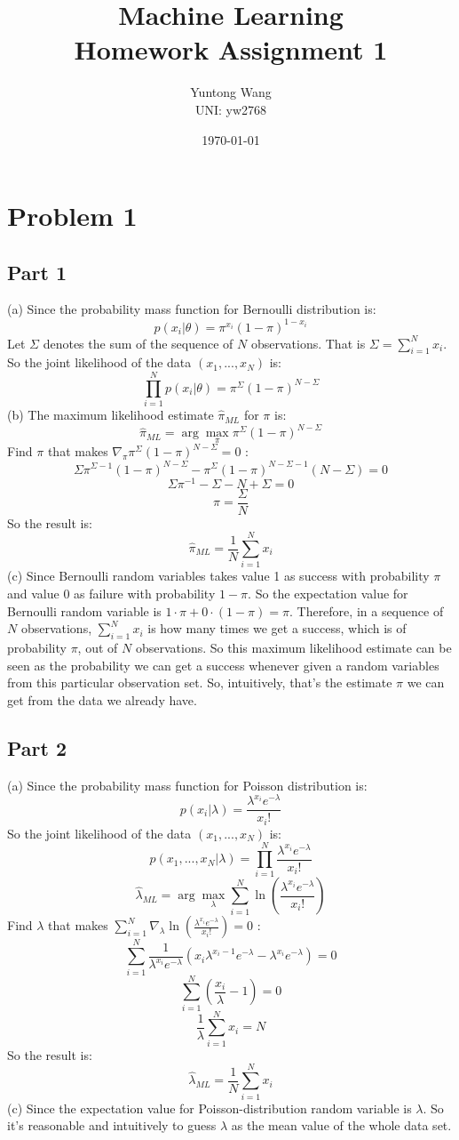 \documentclass{article}
\title{Machine Learning\\Homework Assignment 1}
\author{Yuntong Wang\\UNI: yw2768}
\date{\today}
\begin{document}
\maketitle

\section{Problem 1}

\subsection{Part 1}

(a) Since the probability mass function for Bernoulli distribution is:
$$ p(x_i|\theta) = \pi^{x_i}(1-\pi)^{1-x_i} $$
Let $\Sigma$ denotes the sum of the sequence of $N$ observations. That is  $\Sigma = \displaystyle \sum_{i=1}^{N}x_i$. So the joint likelihood of the data $(x_1,...,x_N)$ is:
$$\prod_{i=1}^{N}p(x_i|\theta) = \pi^\Sigma(1-\pi)^{N-\Sigma}$$
(b) The maximum likelihood estimate $\hat{\pi}_{ML}$ for $\pi$ is:
$$\hat{\pi}_{ML}= \arg \max_{\pi}\pi^\Sigma(1-\pi)^{N-\Sigma}$$
Find $\pi$ that makes $\nabla_{\pi}\pi^\Sigma(1-\pi)^{N-\Sigma}=0$ :
$$\Sigma\pi^{\Sigma-1}(1-\pi)^{N-\Sigma} - \pi^{\Sigma}(1-\pi)^{N-\Sigma-1}(N-\Sigma) = 0$$
$$\Sigma\pi^{-1}-\Sigma-N+\Sigma = 0$$
$$\pi = \frac{\Sigma}{N}$$
So the result is:
$$\hat{\pi}_{ML} = \frac{1}{N}{\displaystyle \sum_{i=1}^{N}x_i}$$
(c) Since Bernoulli random variables takes value 1 as success with probability $\pi$ and value 0 as failure with probability $1-\pi$. So the expectation value for Bernoulli random variable is $1\cdot\pi+0\cdot(1-\pi) = \pi$. Therefore, in a sequence of $N$ observations, ${\displaystyle \sum_{i=1}^{N}x_i}$ is how many times we get a success, which is of probability $\pi$, out of $N$ observations. So this maximum likelihood estimate can be seen as the probability we can get a success whenever given a random variables from this particular observation set. So, intuitively, that's the estimate $\pi$ we can get from the data we already have.

\subsection{Part 2}

(a) Since the probability mass function for Poisson distribution is:
$$ p(x_i|\lambda) = \frac{\lambda^{x_i}e^{-\lambda}}{{x_i}!} $$
So the joint likelihood of the data $(x_1,...,x_N)$ is:
$$p(x_1,...,x_N|\lambda) = \prod_{i=1}^{N}\frac{\lambda^{x_i}e^{-\lambda}}{{x_i}!}$$
$$\hat{\lambda}_{ML} = \arg \max_{\lambda}\sum_{i=1}^{N}\ln(\frac{\lambda^{x_i}e^{-\lambda}}{{x_i}!})$$
Find $\lambda$ that makes $\displaystyle \sum_{i=1}^{N}\nabla_{\lambda}\ln(\frac{\lambda^{x_i}e^{-\lambda}}{{x_i}!})=0$ :
$$\displaystyle \sum_{i=1}^{N}\frac{1}{\lambda^{x_i}e^{-\lambda}}(x_i\lambda^{x_i-1}e^{-\lambda}-\lambda^{x_i}e^{-\lambda}) = 0$$
$$\displaystyle \sum_{i=1}^{N}(\frac{x_i}{\lambda}-1) = 0 $$
$$\frac{1}{\lambda}\displaystyle \sum_{i=1}^{N}x_i = N$$
So the result is:
$$\hat{\lambda}_{ML} = \frac{1}{N}\displaystyle \sum_{i=1}^{N}x_i$$
(c) Since the expectation value for Poisson-distribution random variable is $\lambda$. So it's reasonable and intuitively to guess $\lambda$ as the mean value of the whole data set.
\end{document}
